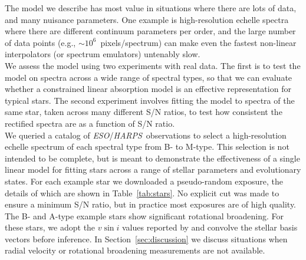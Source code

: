 \documentclass[modern]{aastex631}
\newcommand{\project}[1]{\textit{#1}}
\newcommand{\eso}{\project{ESO}}
\newcommand{\harps}{\project{HARPS}}
\begin{document}
The model we describe has most value in situations where there are lots of data, and many nuisance parameters. One example is high-resolution echelle spectra where there are different continuum parameters per order, and the large number of data points (e.g., $\sim10^6$~pixels/spectrum) can make even the fastest non-linear interpolators (or spectrum emulators) untenably slow.\\

We assess the model using two experiments with real data. The first is to test the model on spectra across a wide range of spectral types, so that we can evaluate whether a constrained linear absorption model is an effective representation for typical stars. The second experiment involves fitting the model to spectra of the same star, taken across many different S/N ratios, to test how consistent the rectified spectra are as a function of S/N ratio.\\


We queried a catalog of \eso/\harps\ observations to select a high-resolution echelle spectrum of each spectral type from B- to M-type. This selection is not intended to be complete, but is meant to demonstrate the effectiveness of a single linear model for fitting stars across a range of stellar parameters and evolutionary states. For each example star we downloaded a pseudo-random exposure, the details of which are shown in Table~\ref{tab:stars}. No explicit cut was made to ensure a minimum S/N ratio, but in practice most exposures are of high quality. The B- and A-type example stars show significant rotational broadening. For these stars, we adopt the $v\sin{i}$ values reported by \citet{Someone} and convolve the stellar basis vectors before inference. In Section~\ref{sec:discussion} we discuss situations when radial velocity or rotational broadening measurements are not available.\\
\end{document}
